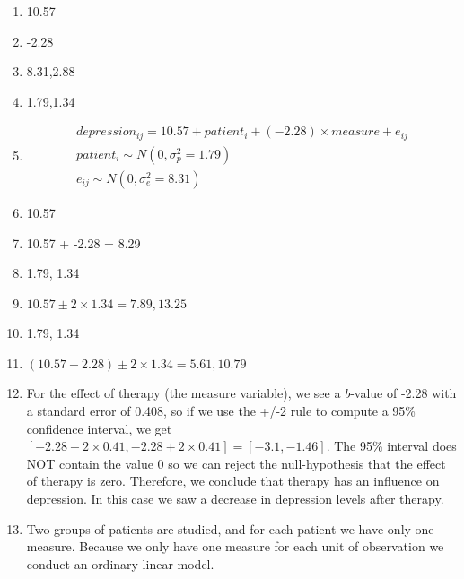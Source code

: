 \documentclass[]{report}\usepackage[]{graphicx}\usepackage[]{color}
\begin{document}
\begin{enumerate}

\item  10.57 \\
\item  -2.28 \\
\item  8.31,2.88 \\
\item  1.79,1.34 \\

\item 
\begin{eqnarray}
depression_{ij} = 10.57 + patient_i + (-2.28) \times measure + e_{ij} \\
patient_i \sim N(0, \sigma_p^2 = 1.79)\\
e_{ij} \sim N(0, \sigma_e^2 = 8.31)
\end{eqnarray}




\item  10.57\\
\item  10.57 + -2.28  = 8.29\\
\item  1.79, 1.34 \\

\item  $10.57 \pm 2 \times 1.34 = {7.89, 13.25}$\\

\item  1.79, 1.34 \\

\item  $(10.57 -2.28)  \pm  2 \times 1.34 = {5.61, 10.79 }   $\\

\item  For the effect of therapy (the measure variable), we see a $b$-value of -2.28 with a standard error of 0.408, so if we use the +/-2 rule to compute a 95\% confidence interval, we get $[ -2.28 - 2\times 0.41 , -2.28 + 2\times 0.41]  = [ -3.1 ,  -1.46]$. The 95\% interval does NOT contain the value 0 so we can reject the null-hypothesis that the effect of therapy is zero. Therefore, we conclude that therapy has an influence on depression. In this case we saw a decrease in depression levels after therapy.

\item  Two groups of patients are studied, and for each patient we have only one measure. Because we only have one measure for each unit of observation we conduct an ordinary linear model.


\end{enumerate}
\end{document}
